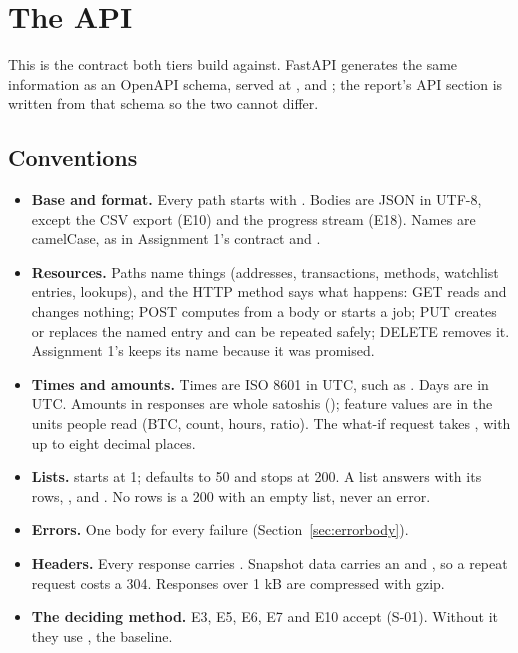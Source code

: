 \section{The API}
\label{sec:api}

This is the contract both tiers build against. FastAPI generates the same information as an OpenAPI
schema, served at ,  and ; the report's API section is
written from that schema so the two cannot differ.

\subsection{Conventions}
\label{sec:apiconventions}

\begin{itemize}
  \item \textbf{Base and format.} Every path starts with . Bodies are JSON in UTF-8,
    except the CSV export (E10) and the progress stream (E18). Names are camelCase, as in
    Assignment 1's contract and .
  \item \textbf{Resources.} Paths name things (addresses, transactions, methods, watchlist entries,
    lookups), and the HTTP method says what happens: GET reads and changes nothing; POST computes
    from a body or starts a job; PUT creates or replaces the named entry and can be repeated safely;
    DELETE removes it. Assignment 1's  keeps its name because it was promised.
  \item \textbf{Times and amounts.} Times are ISO 8601 in UTC, such as .
    Days are  in UTC. Amounts in responses are whole satoshis ();
    feature values are in the units people read (BTC, count, hours, ratio). The what-if request
    takes , with up to eight decimal places.
  \item \textbf{Lists.}  starts at 1;  defaults to 50 and stops at 200.
    A list answers with its rows, ,  and . No rows is a 200
    with an empty list, never an error.
  \item \textbf{Errors.} One body for every failure (Section~\ref{sec:errorbody}).
  \item \textbf{Headers.} Every response carries . Snapshot data carries an
     and , so a repeat request costs a 304. Responses over
    1 kB are compressed with gzip.
  \item \textbf{The deciding method.} E3, E5, E6, E7 and E10 accept  (S-01). Without
    it they use , the baseline.
\end{itemize}

